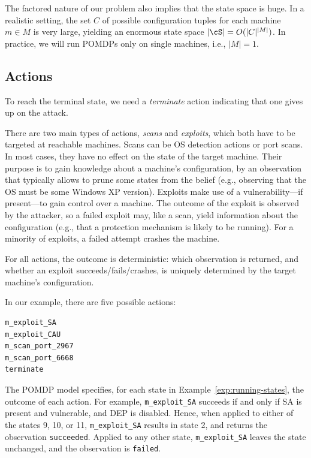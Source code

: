 The factored nature of our problem also implies that the state space
is huge. In a realistic setting, the set $C$ of possible configuration
tuples for each machine $m \in M$ is very large, yielding an enormous
state space $|\cS|=O(|C|^{|M|})$. In practice, we will run POMDPs only
on single machines, i.e., $|M|=1$.




\subsection{Actions}
\label{POMDP-model:actions}

To reach the terminal state, we need a \emph{terminate} action
indicating that one gives up on the attack. 

There are two main types of actions, \emph{scans} and \emph{exploits},
which both have to be targeted at reachable machines.
%
Scans can be OS detection actions or port scans. In most cases, they
have no effect on the state of the target machine. Their purpose is to
gain knowledge about a machine's configuration, by an observation that
typically allows to prune some states from the belief (e.g., observing
that the OS must be some Windows XP version). %
Exploits make use of a vulnerability---if present---to gain control
over a machine. The outcome of the exploit is observed by the
attacker, so a failed exploit may, like a scan, yield information
about the configuration (e.g., that a protection mechanism is likely
to be running). For a minority of exploits, a failed attempt crashes
the machine. 

For all actions, the outcome is deterministic: which observation is
returned, and whether an exploit succeeds/fails/crashes, is uniquely
determined by the target machine's configuration.

\begin{example}\label{exp:running-actions}
In our example, there are five possible actions:\\ {\scriptsize
\begin{minipage}[t]{.4\linewidth}
\begin{verbatim}
m_exploit_SA
m_exploit_CAU
m_scan_port_2967
m_scan_port_6668
terminate
\end{verbatim}
\end{minipage}
}

\smallskip
\noindent
The POMDP model specifies, for each state in
Example~\ref{exp:running-states}, the outcome of each action. For
example, {\scriptsize \verb+m_exploit_SA+} succeeds if and only if SA
is present and vulnerable, and DEP is disabled. Hence, when applied to
either of the states 9, 10, or 11, {\scriptsize \verb+m_exploit_SA+}
results in state 2, and returns the observation {\scriptsize
  \verb+succeeded+}. Applied to any other state, {\scriptsize
  \verb+m_exploit_SA+} leaves the state unchanged, and the observation
is {\scriptsize \verb+failed+}.
\end{example}

